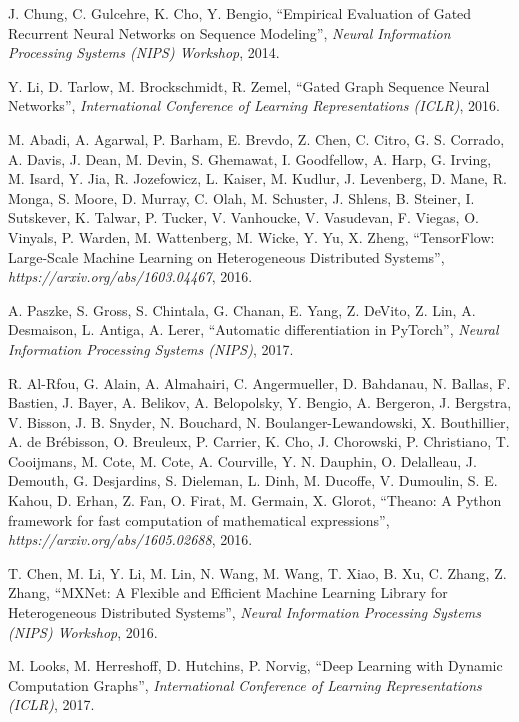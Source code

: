 \documentclass[a4paper]{article}
\begin{document}
\begin{thebibliography}{9}
   J. Chung, C. Gulcehre, K. Cho, Y. Bengio,
   ``Empirical Evaluation of Gated Recurrent Neural Networks on Sequence Modeling'',
   \textit{Neural Information Processing Systems (NIPS) Workshop}, 2014.
   
   Y. Li, D. Tarlow, M. Brockschmidt, R. Zemel,
   ``Gated Graph Sequence Neural Networks'',
   \textit{International Conference of Learning Representations (ICLR)}, 2016.

   M. Abadi, A. Agarwal, P. Barham, E. Brevdo, Z. Chen, C. Citro, G. S. Corrado, A. Davis, J. Dean, M. Devin, S. Ghemawat, I. Goodfellow, A. Harp, G. Irving, M. Isard, Y. Jia, R. Jozefowicz, L. Kaiser, M. Kudlur, J. Levenberg, D. Mane, R. Monga, S. Moore, D. Murray, C. Olah, M. Schuster, J. Shlens, B. Steiner, I. Sutskever, K. Talwar, P. Tucker, V. Vanhoucke, V. Vasudevan, F. Viegas, O. Vinyals, P. Warden, M. Wattenberg, M. Wicke, Y. Yu, X. Zheng,
   ``TensorFlow: Large-Scale Machine Learning on Heterogeneous Distributed Systems'',
   \textit{https://arxiv.org/abs/1603.04467}, 2016.

   A. Paszke, S. Gross, S. Chintala, G. Chanan, E. Yang, Z. DeVito, Z. Lin, A. Desmaison, L. Antiga, A. Lerer,
   ``Automatic differentiation in PyTorch'',
   \textit{Neural Information Processing Systems (NIPS)}, 2017.

    R. Al-Rfou, G. Alain, A. Almahairi, C. Angermueller, D. Bahdanau, N. Ballas, F. Bastien, J. Bayer, A. Belikov, A. Belopolsky, Y. Bengio, A. Bergeron, J. Bergstra, V. Bisson, J. B. Snyder, N. Bouchard, N. Boulanger-Lewandowski, X. Bouthillier, A. de Brébisson, O. Breuleux, P. Carrier, K. Cho, J. Chorowski, P. Christiano, T. Cooijmans, M. Cote, M. Cote, A. Courville, Y. N. Dauphin, O. Delalleau, J. Demouth, G. Desjardins, S. Dieleman, L. Dinh, M. Ducoffe, V. Dumoulin, S. E. Kahou, D. Erhan, Z. Fan, O. Firat, M. Germain, X. Glorot,
   ``Theano: A Python framework for fast computation of mathematical expressions'',
   \textit{https://arxiv.org/abs/1605.02688}, 2016.
   
    T. Chen, M. Li, Y. Li, M. Lin, N. Wang, M. Wang, T. Xiao, B. Xu, C. Zhang, Z. Zhang,
   ``MXNet: A Flexible and Efficient Machine Learning Library for Heterogeneous Distributed Systems'',
   \textit{Neural Information Processing Systems (NIPS) Workshop}, 2016.
   
    M. Looks, M. Herreshoff, D. Hutchins, P. Norvig,
   ``Deep Learning with Dynamic Computation Graphs'',
   \textit{International Conference of Learning Representations (ICLR)}, 2017.

\end{thebibliography}
\end{document}
